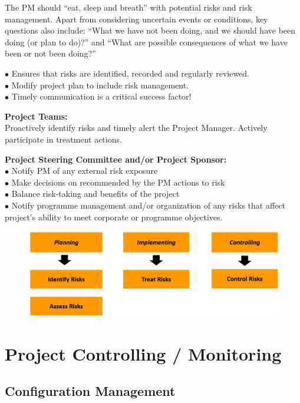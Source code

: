 \documentclass[]{project_plan}
\newcommand{\bulletPoint}{\hspace{-3.1pt}$\bullet$ \hspace{5pt}}
\begin{document}
The PM should “eat, sleep and breath” with potential risks and risk management. Apart from considering uncertain events or conditions, key
questions also include: “What we have not been doing, and we should have been doing (or plan to do)?” and “What are
possible consequences of what we have been or not been doing?”

\bulletPoint Ensures that risks are identified, recorded and regularly reviewed.\\
\bulletPoint Modify project plan to include risk management.\\
\bulletPoint Timely communication is a critical success factor!

\textbf{Project Teams:}\\
Proactively identify risks and timely alert the Project Manager. Actively participate in treatment actions.

\textbf{Project Steering Committee and/or Project Sponsor:}\\
\bulletPoint Notify PM of any external risk exposure\\
\bulletPoint Make decisions on recommended by the PM actions to risk\\
\bulletPoint Balance risk-taking and benefits of the project\\
\bulletPoint Notify programme management and/or organization of any risks that affect project’s ability to meet corporate or
programme objectives.

\begin{figure}[h!]
  \centering
  \includegraphics[width=\linewidth]{risk_management_stages.png}
\end{figure}

\chapter{Project Controlling / Monitoring}

\section{Configuration Management}
\end{document}
